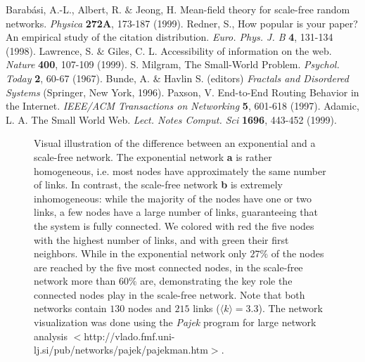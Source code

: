 \begin{references}
 Barab\'asi, A.-L., Albert, R. $\&$ Jeong, H. Mean-field theory for scale-free random networks. {\it Physica} {\bf 272A}, 173-187 (1999).
 Redner, S., How popular is your paper? An empirical study of the citation distribution. {\it Euro. Phys. J. B} {\bf 4}, 131-134 (1998).
Lawrence, S. $\&$ Giles, C. L. Accessibility of information on the web. {\it Nature} {\bf 400}, 107-109 (1999).
S. Milgram, The Small-World Problem. {\it Psychol. Today} {\bf 2}, 60-67 (1967).
 Bunde, A. $\&$ Havlin S. (editors) {\it Fractals and Disordered Systems} (Springer, New York, 1996).
Paxson, V. End-to-End Routing Behavior in the Internet. {\it IEEE/ACM Transactions on Networking} {\bf 5}, 601-618 (1997).
Adamic, L. A. The Small World Web. {\it Lect. Notes Comput. Sci} {\bf 1696}, 443-452 (1999).
\end{references}

\begin{figure}[htb]
\renewcommand\baselinestretch{0.90}
\caption{ Visual illustration of the difference between an exponential and a scale-free network. The exponential network {\bf a} is rather homogeneous, i.e. most nodes have approximately the same number of links. In contrast, the scale-free network {\bf b} is extremely inhomogeneous: while the majority of the nodes have one or two links, a few nodes have a large number of links, guaranteeing that the system is fully connected. We colored with red the five nodes with the highest number of links, and  with green their first neighbors. While in the exponential network only $27\%$ of the nodes are reached by the five most connected nodes, in the scale-free network more than $60\%$ are, demonstrating the key role the connected nodes play in the scale-free network. Note that both networks contain $130$ nodes and $215$ links ($\langle k\rangle=3.3$). The network visualization was done using the {\it Pajek} program for large network analysis
$<$http://vlado.fmf.uni-lj.si/pub/networks/pajek/pajekman.htm$>$.}
\end{figure}

\newpage


